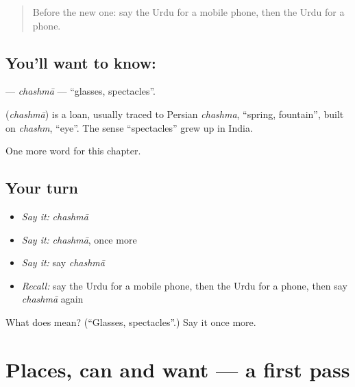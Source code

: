 \label{lesson:UR-C110-chashma}



\begin{quote}
Before the new one: say the Urdu for a mobile phone, then the Urdu for a phone.
\end{quote}

\subsection*{You'll want to know: }
\textbf{} — \emph{chashmā} — \textquotedblleft{}glasses, spectacles\textquotedblright{}.

\begin{cousinweb}
\textbf{} (\emph{chashmā}) is a loan, usually traced to Persian \emph{chashma}, \textquotedblleft{}spring, fountain\textquotedblright{}, built on \emph{chashm}, \textquotedblleft{}eye\textquotedblright{}. The sense \textquotedblleft{}spectacles\textquotedblright{} grew up in India.
\end{cousinweb}

\begin{grammarlens}[title={What you've built}]
One more word for this chapter.
\end{grammarlens}

\subsection*{Your turn}
\begin{itemize}
\raggedright
  \item \emph{Say it:} \emph{chashmā}
  \item \emph{Say it:} \emph{chashmā}, once more
  \item \emph{Say it:} say \emph{chashmā}
  \item \emph{Recall:} say the Urdu for a mobile phone, then the Urdu for a phone, then say \emph{chashmā} again
\end{itemize}

\begin{tcolorbox}[breakable,colback=teal!4,colframe=teal!35!black,title={Before you move on}]
What does  mean? (\textquotedblleft{}Glasses, spectacles\textquotedblright{}.) Say it once more.
\end{tcolorbox}
\section[(dialogue)]{Places, can and want — a first pass}

